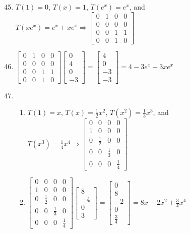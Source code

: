 \documentclass[12pt]{article}
\begin{document}
\begin{enumerate}
    \setcounter{enumi}{44}

  \item $T(1)=0$, $T(x)=1$, $T(e^x)=e^x$, and $T(xe^x)=e^x+xe^x\Rightarrow\begin{bmatrix} 0 & 1 & 0 & 0\\ 0 & 0 & 0 & 0\\ 0 & 0 & 1 & 1\\ 0 & 0 & 1 & 0\end{bmatrix}$

    \setcounter{enumi}{46}

  \item $\begin{bmatrix} 0 & 1 & 0 & 0\\ 0 & 0 & 0 & 0\\ 0 & 0 & 1 & 1\\ 0 & 0 & 1 & 0\end{bmatrix}\begin{bmatrix} 0\\ 4\\ 0\\ -3\end{bmatrix}=\begin{bmatrix} 4\\ 0\\-3\\-3\end{bmatrix}=4-3e^x-3xe^x$

    \setcounter{enumi}{48}

  \item

    \begin{enumerate}

      \item $T(1)=x$, $T(x)=\frac{1}{2}x^2$, $T(x^2)=\frac{1}{3}x^3$, and $T(x^3)=\frac{1}{4}x^4\Rightarrow\begin{bmatrix} 0 & 0 & 0 & 0\\ 1 & 0 & 0 & 0\\ 0 & \frac{1}{2} & 0 & 0\\ 0 & 0 & \frac{1}{3} & 0\\ 0 & 0 & 0 & \frac{1}{4}  \end{bmatrix}$

      \item $\begin{bmatrix} 0 & 0 & 0 & 0\\ 1 & 0 & 0 & 0\\ 0 & \frac{1}{2} & 0 & 0\\ 0 & 0 & \frac{1}{3} & 0\\ 0 & 0 & 0 & \frac{1}{4}  \end{bmatrix}\begin{bmatrix} 8\\ -4\\0\\3\end{bmatrix}=\begin{bmatrix} 0\\8\\-2\\0\\\frac{3}{4}  \end{bmatrix}=8x-2x^2+\frac{3}{4}x^4$


\end{enumerate}
\end{enumerate}
\end{document}
